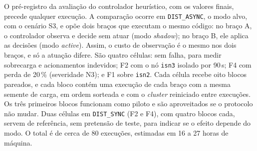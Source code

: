 O pré-registro da avaliação do controlador heurístico, com os valores finais, precede qualquer execução. A comparação ocorre em \texttt{DIST\_ASYNC}, o modo alvo, com o cenário S3, e opõe dois braços que executam o mesmo código: no braço A, o controlador observa e decide sem atuar (modo \emph{shadow}); no braço B, ele aplica as decisões (modo \emph{active}). Assim, o custo de observação é o mesmo nos dois braços, e só a atuação difere. São quatro células: sem falha, para medir sobrecarga e acionamentos indevidos; F2 com o nó \texttt{isn3} isolado por 90\,s; F4 com perda de 20\,\% (severidade N3); e F1 sobre \texttt{isn2}. Cada célula recebe oito blocos pareados, e cada bloco contém uma execução de cada braço com a mesma semente de carga, em ordem sorteada e com o \emph{cluster} reiniciado entre execuções. Os três primeiros blocos funcionam como piloto e são aproveitados se o protocolo não mudar. Duas células em \texttt{DIST\_SYNC} (F2 e F4), com quatro blocos cada, servem de referência, sem pretensão de teste, para indicar se o efeito depende do modo. O total é de cerca de 80 execuções, estimadas em 16 a 27 horas de máquina.

